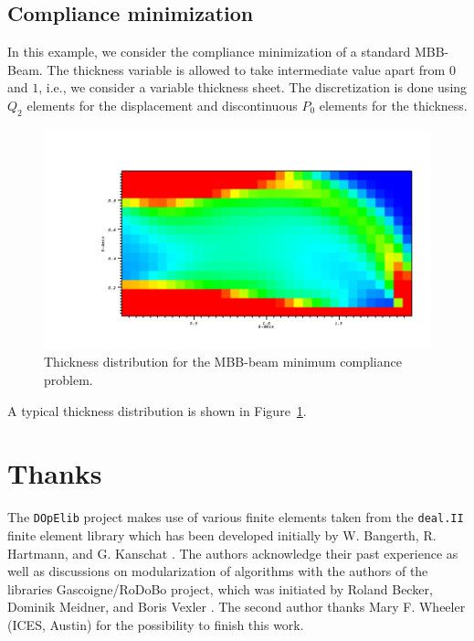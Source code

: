 \documentclass[prodmode,acmtoms]{acmsmall}
\numberwithin{equation}{section}
\newcommand{\deal}{\texttt{deal.II}}
\newcommand{\dope}{\texttt{DOpElib}}
\begin{document}
\subsection{Compliance minimization}
In this example, we consider the compliance minimization of a standard MBB-Beam. 
The thickness variable is allowed to take intermediate value apart from $0$ and $1$,
i.e., we consider a variable thickness sheet. The discretization is done 
using $Q_2$ elements for the displacement and discontinuous $P_0$ elements for the 
thickness.
\begin{figure}
\centering
\includegraphics[width=1.\textwidth, viewport=150 0 1024 500, clip]{Pictures/MBB.png}
\caption{Thickness distribution for the MBB-beam minimum compliance problem.} 
\label{res:mbb}
\end{figure}
A typical thickness distribution is shown in Figure~\ref{res:mbb}.


\section*{Thanks}
The \dope{} project makes use of various finite elements taken from  
the \deal{} \cite{dealnew} finite element library which has been developed
 initially by W. Bangerth, R. Hartmann, and G. Kanschat \cite{dealold}.
The authors acknowledge their past experience as well as discussions 
on modularization of algorithms
with 
the authors of the libraries 
Gascoigne/RoDoBo project, which was initiated by 
Roland Becker, Dominik Meidner, and Boris Vexler \cite{rodobo}. 
The second author thanks Mary F. Wheeler (ICES, Austin) for the 
possibility to finish this work.

%


%
\end{document}
